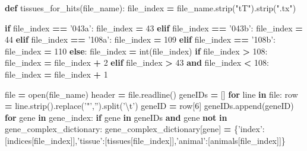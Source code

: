 \documentclass[
]{article}
\newenvironment{Shaded}{\begin{snugshade}}{\end{snugshade}}
\newcommand{\BuiltInTok}[1]{#1}
\newcommand{\CharTok}[1]{\textcolor[rgb]{0.31,0.60,0.02}{#1}}
\newcommand{\ControlFlowTok}[1]{\textcolor[rgb]{0.13,0.29,0.53}{\textbf{#1}}}
\newcommand{\DecValTok}[1]{\textcolor[rgb]{0.00,0.00,0.81}{#1}}
\newcommand{\KeywordTok}[1]{\textcolor[rgb]{0.13,0.29,0.53}{\textbf{#1}}}
\newcommand{\NormalTok}[1]{#1}
\newcommand{\OperatorTok}[1]{\textcolor[rgb]{0.81,0.36,0.00}{\textbf{#1}}}
\newcommand{\StringTok}[1]{\textcolor[rgb]{0.31,0.60,0.02}{#1}}
\begin{document}
\begin{Shaded}
\begin{Highlighting}[]
\KeywordTok{def}\NormalTok{ tissues_for_hits(file_name):}
\NormalTok{  file_index }\OperatorTok{=}\NormalTok{ file_name.strip(}\StringTok{"tT"}\NormalTok{).strip(}\StringTok{".tx"}\NormalTok{)}
  
  \ControlFlowTok{if}\NormalTok{ file_index }\OperatorTok{==} \StringTok{'043a'}\NormalTok{:}
\NormalTok{    file_index }\OperatorTok{=} \DecValTok{43}
  \ControlFlowTok{elif}\NormalTok{ file_index }\OperatorTok{==} \StringTok{'043b'}\NormalTok{:}
\NormalTok{    file_index }\OperatorTok{=} \DecValTok{44}
  \ControlFlowTok{elif}\NormalTok{ file_index }\OperatorTok{==} \StringTok{'108a'}\NormalTok{:}
\NormalTok{    file_index }\OperatorTok{=} \DecValTok{109}
  \ControlFlowTok{elif}\NormalTok{ file_index }\OperatorTok{==} \StringTok{'108b'}\NormalTok{:}
\NormalTok{    file_index }\OperatorTok{=} \DecValTok{110}
  \ControlFlowTok{else}\NormalTok{:}
\NormalTok{    file_index }\OperatorTok{=} \BuiltInTok{int}\NormalTok{(file_index)}
    \ControlFlowTok{if}\NormalTok{ file_index }\OperatorTok{>} \DecValTok{108}\NormalTok{:}
\NormalTok{      file_index }\OperatorTok{=}\NormalTok{ file_index }\OperatorTok{+} \DecValTok{2}
    \ControlFlowTok{elif}\NormalTok{ file_index }\OperatorTok{>} \DecValTok{43} \KeywordTok{and}\NormalTok{ file_index }\OperatorTok{<} \DecValTok{108}\NormalTok{:}
\NormalTok{      file_index }\OperatorTok{=}\NormalTok{ file_index }\OperatorTok{+} \DecValTok{1}

  \BuiltInTok{file} \OperatorTok{=} \BuiltInTok{open}\NormalTok{(file_name)}
\NormalTok{  header }\OperatorTok{=} \BuiltInTok{file}\NormalTok{.readline()}
\NormalTok{  geneIDs }\OperatorTok{=}\NormalTok{ []}
  \ControlFlowTok{for}\NormalTok{ line }\KeywordTok{in} \BuiltInTok{file}\NormalTok{:}
\NormalTok{    row }\OperatorTok{=}\NormalTok{ line.strip().replace(}\StringTok{'"'}\NormalTok{,}\StringTok{''}\NormalTok{).split(}\StringTok{'}\CharTok{\textbackslash{}t}\StringTok{'}\NormalTok{)}
\NormalTok{    geneID }\OperatorTok{=}\NormalTok{ row[}\DecValTok{6}\NormalTok{]}
\NormalTok{    geneIDs.append(geneID)}
  \ControlFlowTok{for}\NormalTok{ gene }\KeywordTok{in}\NormalTok{ gene_index:}
    \ControlFlowTok{if}\NormalTok{ gene }\KeywordTok{in}\NormalTok{ geneIDs }\KeywordTok{and}\NormalTok{ gene }\KeywordTok{not} \KeywordTok{in}\NormalTok{ gene_complex_dictionary:}
\NormalTok{      gene_complex_dictionary[gene] }\OperatorTok{=}\NormalTok{ \{}\StringTok{'index'}\NormalTok{:[indices[file_index]],}\StringTok{'tissue'}\NormalTok{:[tissues[file_index]],}\StringTok{'animal'}\NormalTok{:[animals[file_index]]\}}


\end{Highlighting}
\end{Shaded}
\end{document}
